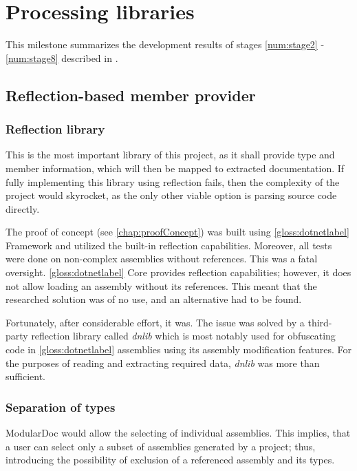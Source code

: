 \chapter{Processing libraries} \label{chap:processingLibraries}

This milestone summarizes the development results of stages \ref{num:stage2} - \ref{num:stage8} described in .

\section{Reflection-based member provider}

\subsection{Reflection library}

This is the most important library of this project, as it shall provide type and member information, which will then be mapped to extracted documentation. If fully implementing this library using reflection fails, then the complexity of the project would skyrocket, as the only other viable option is parsing source code directly.

The proof of concept (see \ref{chap:proofConcept}) was built using \ref{gloss:dotnetlabel} Framework and utilized the built-in reflection capabilities. Moreover, all tests were done on non-complex assemblies without references. This was a fatal oversight. \ref{gloss:dotnetlabel} Core provides reflection capabilities; however, it does not allow loading an assembly without its references. This meant that the researched solution was of no use, and an alternative had to be found.

Fortunately, after considerable effort, it was. The issue was solved by a third-party reflection library called \textit{dnlib} which is most notably used for obfuscating code in \ref{gloss:dotnetlabel} assemblies using its assembly modification features. For the purposes of reading and extracting required data, \textit{dnlib} was more than sufficient.

\subsection{Separation of types}

ModularDoc would allow the selecting of individual assemblies. This implies, that a user can select only a subset of assemblies generated by a project; thus, introducing the possibility of exclusion of a referenced assembly and its types.

